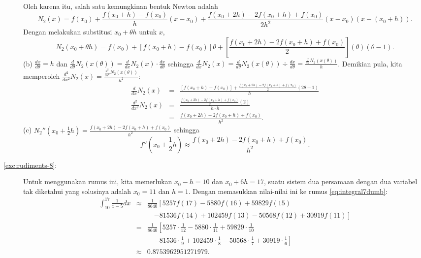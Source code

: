 \begin{description}
\noindent\begin{flushleft}
Oleh karena itu, salah satu kemungkinan bentuk Newton adalah
\[
N_{2}(x)=f(x_{0})+\frac{f(x_{0}+h)-f(x_{0})}{h}(x-x_{0})+\frac{f(x_{0}+2h)-2f(x_{0}+h)+f(x_{0})}{2h^{2}}(x-x_{0})(x-(x_{0}+h)).
\]
Dengan melakukan substitusi $x_{0}+\theta h$ untuk $x$,
\[
N_{2}(x_{0}+\theta h)=f(x_{0})+\left[f(x_{0}+h)-f(x_{0})\right]\theta+\left[\frac{f(x_{0}+2h)-2f(x_{0}+h)+f(x_{0})}{2}\right](\theta)(\theta-1).
\]
(b) $\frac{dx}{d\theta}=h$ dan $\frac{d}{d\theta}N_{2}(x(\theta))=\frac{d}{dx}N_{2}(x)\cdot\frac{dx}{d\theta}$
sehingga ${\displaystyle \frac{d}{dx}N_{2}(x)=\frac{d}{d\theta}N_{2}(x(\theta))\div\frac{dx}{d\theta}=\frac{\frac{d}{d\theta}N_{2}(x(\theta))}{h}}$.
Demikian pula, kita memperoleh ${\displaystyle \frac{d^{2}}{dx^{2}}N_{2}(x)=\frac{\frac{d^{2}}{d\theta^{2}}N_{2}(x(\theta))}{h^{2}}}$:
\begin{eqnarray*}
\frac{d}{dx}N_{2}(x) & = & \frac{\left[f(x_{0}+h)-f(x_{0})\right]+\frac{f(x_{0}+2h)-2f(x_{0}+h)+f(x_{0})}{2}(2\theta-1)}{h}\\
\frac{d^{2}}{dx^{2}}N_{2}(x) & = & \frac{\frac{f(x_{0}+2h)-2f(x_{0}+h)+f(x_{0})}{2}(2)}{h\cdot h}\\
 & = & \frac{f(x_{0}+2h)-2f(x_{0}+h)+f(x_{0})}{h^{2}}.
\end{eqnarray*}
(c) $N_{2}''(x_{0}+\frac{1}{2}h)=\frac{f(x_{0}+2h)-2f(x_{0}+h)+f(x_{0})}{h^{2}}$
sehingga
\[
f''\left(x_{0}+\frac{1}{2}h\right)\approx\frac{f(x_{0}+2h)-2f(x_{0}+h)+f(x_{0})}{h^{2}}.
\]
\par\end{flushleft}
\item [{\ref{exc:rudiments-8}:}] Untuk menggunakan rumus ini, kita memerlukan
$x_{0}-h=10$ dan $x_{0}+6h=17$, suatu sistem dua persamaan dengan
dua variabel tak diketahui yang solusinya adalah $x_{0}=11$ dan $h=1$.
Dengan memasukkan nilai-nilai ini ke rumus \ref{eq:integral7dumb}:
\begin{eqnarray*}
\int_{10}^{17}\frac{1}{x-5}dx & \approx & \frac{1}{8640}\left[5257f(17)-5880f(16)+59829f(15)\right.\\
 &  & \quad\left.-81536f(14)+102459f(13)-50568f(12)+30919f(11)\right]\\
 & = & \frac{1}{8640}\left[5257\cdot\frac{1}{12}-5880\cdot\frac{1}{11}+59829\cdot\frac{1}{10}\right.\\
 &  & \quad\left.-81536\cdot\frac{1}{9}+102459\cdot\frac{1}{8}-50568\cdot\frac{1}{7}+30919\cdot\frac{1}{6}\right]\\
 & \approx & 0.8753962951271979.
\end{eqnarray*}

\end{description}
